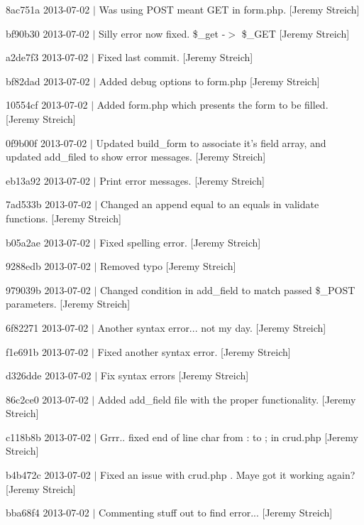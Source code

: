 \begin{DoxyItemize}
\item 8ac751a 2013-\/07-\/02 $|$ Was using P\-O\-S\-T meant G\-E\-T in form.\-php. \mbox{[}Jeremy Streich\mbox{]}
\item bf90b30 2013-\/07-\/02 $|$ Silly error now fixed. \$\-\_\-get -\/$>$ \$\-\_\-\-G\-E\-T \mbox{[}Jeremy Streich\mbox{]}
\item a2de7f3 2013-\/07-\/02 $|$ Fixed last commit. \mbox{[}Jeremy Streich\mbox{]}
\item bf82dad 2013-\/07-\/02 $|$ Added debug options to form.\-php \mbox{[}Jeremy Streich\mbox{]}
\item 10554cf 2013-\/07-\/02 $|$ Added form.\-php which presents the form to be filled. \mbox{[}Jeremy Streich\mbox{]}
\item 0f9b00f 2013-\/07-\/02 $|$ Updated build\-\_\-form to associate it's field array, and updated add\-\_\-filed to show error messages. \mbox{[}Jeremy Streich\mbox{]}
\item eb13a92 2013-\/07-\/02 $|$ Print error messages. \mbox{[}Jeremy Streich\mbox{]}
\item 7ad533b 2013-\/07-\/02 $|$ Changed an append equal to an equals in validate functions. \mbox{[}Jeremy Streich\mbox{]}
\item b05a2ae 2013-\/07-\/02 $|$ Fixed spelling error. \mbox{[}Jeremy Streich\mbox{]}
\item 9288edb 2013-\/07-\/02 $|$ Removed typo \mbox{[}Jeremy Streich\mbox{]}
\item 979039b 2013-\/07-\/02 $|$ Changed condition in add\-\_\-field to match passed \$\-\_\-\-P\-O\-S\-T parameters. \mbox{[}Jeremy Streich\mbox{]}
\item 6f82271 2013-\/07-\/02 $|$ Another syntax error... not my day. \mbox{[}Jeremy Streich\mbox{]}
\item f1e691b 2013-\/07-\/02 $|$ Fixed another syntax error. \mbox{[}Jeremy Streich\mbox{]}
\item d326dde 2013-\/07-\/02 $|$ Fix syntax errors \mbox{[}Jeremy Streich\mbox{]}
\item 86c2ce0 2013-\/07-\/02 $|$ Added add\-\_\-field file with the proper functionality. \mbox{[}Jeremy Streich\mbox{]}
\item c118b8b 2013-\/07-\/02 $|$ Grrr.. fixed end of line char from \-: to ; in crud.\-php \mbox{[}Jeremy Streich\mbox{]}
\item b4b472c 2013-\/07-\/02 $|$ Fixed an issue with crud.\-php . Maye got it working again? \mbox{[}Jeremy Streich\mbox{]}
\item bba68f4 2013-\/07-\/02 $|$ Commenting stuff out to find error... \mbox{[}Jeremy Streich\mbox{]}

\end{DoxyItemize}
